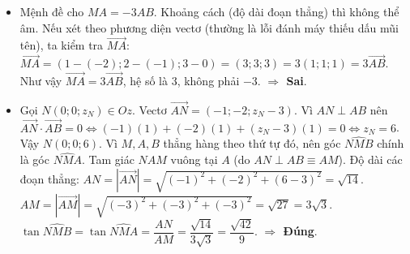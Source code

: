 \documentclass[12pt,a4paper]{article}
\def\vec{\overrightarrow}
\begin{document}
\begin{ex}
{\begin{apdungbox}
\begin{itemize}
    \item[c)] Mệnh đề cho $MA = -3AB$. Khoảng cách (độ dài đoạn thẳng) thì không thể âm. 
    Nếu xét theo phương diện vectơ (thường là lỗi đánh máy thiếu dấu mũi tên), ta kiểm tra $\vec{MA}$:
    $\vec{MA} = (1 - (-2); 2 - (-1); 3 - 0) = (3; 3; 3) = 3(1; 1; 1) = 3\vec{AB}$.
    Như vậy $\vec{MA} = 3\vec{AB}$, hệ số là $3$, không phải $-3$.
    \textbf{$\Rightarrow$ Sai}.

    \item[d)] Gọi $N(0; 0; z_N) \in Oz$.
    Vectơ $\vec{AN} = (-1; -2; z_N-3)$.
    Vì $AN \perp AB$ nên $\vec{AN} \cdot \vec{AB} = 0 \Leftrightarrow (-1)(1) + (-2)(1) + (z_N-3)(1) = 0 \Leftrightarrow z_N = 6$.
    Vậy $N(0; 0; 6)$.
    Vì $M, A, B$ thẳng hàng theo thứ tự đó, nên góc $\widehat{NMB}$ chính là góc $\widehat{NMA}$.
    Tam giác $NAM$ vuông tại $A$ (do $AN \perp AB \equiv AM$).
    Độ dài các đoạn thẳng:
    $AN = |\vec{AN}| = \sqrt{(-1)^2 + (-2)^2 + (6-3)^2} = \sqrt{14}$.
    $AM = |\vec{AM}| = \sqrt{(-3)^2 + (-3)^2 + (-3)^2} = \sqrt{27} = 3\sqrt{3}$.
    $\tan \widehat{NMB} = \tan \widehat{NMA} = \dfrac{AN}{AM} = \dfrac{\sqrt{14}}{3\sqrt{3}} = \dfrac{\sqrt{42}}{9}$.
    \textbf{$\Rightarrow$ Đúng}.
\end{itemize}

\begin{center}
\end{center}
\end{apdungbox}
}
\end{ex}
\end{document}
